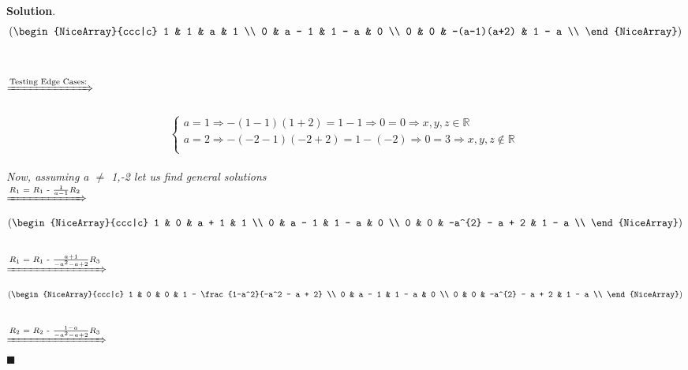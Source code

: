 \documentclass[12pt]{article}
\renewcommand{\=}[1]{\stackrel{#1}{=}} %
\theoremstyle{definition}
\newenvironment{s}{%
        \begin{trivlist} \item \textbf{Solution}. }{%
            \hspace*{\fill} $\blacksquare$\end{trivlist}}%
\begin{document}
\begin{s}
  \[
    \left(\begin{NiceArray}{ccc|c}
      1 & 1     & a             & 1 \\
      0 & a - 1 & 1 - a         & 0 \\
      0 & 0     & -(a-1)(a+2) & 1 - a \\
    \end{NiceArray} \right)
  \]
  \\
  \\
  $\xRightarrow{\text{Testing Edge Cases:}}$ \\
  \\
  \begin{equation}
    \begin{cases}
      a = 1 \Rightarrow - (1-1)(1+2) = 1 - 1 \Rightarrow 0 = 0 \Rightarrow x,y,z \in \mathbb{R} \\
      a = 2 \Rightarrow - (-2-1)(-2+2) = 1 - (-2) \Rightarrow 0 = 3 \Rightarrow x,y,z \notin \mathbb{R} \\
    
    \end{cases}\
  \end{equation}
  \\
  \emph{Now, assuming a $\neq$ 1,-2 let us find general solutions} \\
  $\xRightarrow{\text{$R_1$ = $R_1$ - $ \frac{1}{a - 1} R_2$}}$
  \\
     
  \[
    \left(\begin{NiceArray}{ccc|c}
      1 & 0     & a + 1         & 1 \\
      0 & a - 1 & 1 - a         & 0 \\
      0 & 0     & -a^{2} - a + 2 & 1 - a \\
    \end{NiceArray} \right)
  \]
  \\
  $\xRightarrow{\text{$R_1$ = $R_1$ - $ \frac{a + 1}{-a^2 - a + 2} R_3$}}$
  \\
     
  \[
    \left(\begin{NiceArray}{ccc|c}
      1 & 0     & 0                  & 1 - \frac{1-a^2}{-a^2 - a + 2} \\
      0 & a - 1 & 1 - a              & 0     \\
      0 & 0     & -a^{2} - a + 2     & 1 - a \\
    \end{NiceArray} \right)
  \]
  \\
  $\xRightarrow{\text{$R_2$ = $R_2$ - $ \frac{1 - a}{-a^2 - a + 2} R_3$}}$
  \\
     

\end{s}
\end{document}
